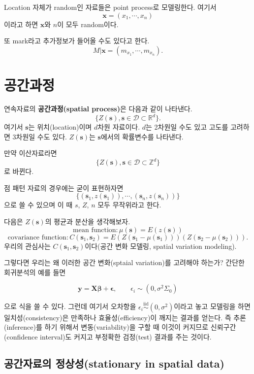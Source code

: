 \documentclass[b5paper,]{scrbook}
\theoremstyle{plain}
\theoremstyle{definition}
\numberwithin{equation}{section}
\begin{document}
Location 자체가 random인 자료들은 point process로 모델링한다. 여기서
\[\mathbf{x}=(x_{1}, \cdots , x_{n})\] 이라고 하면 \(\mathbf{x}\)와
\(n\)이 모두 random이다.

또 mark라고 추가정보가 들어올 수도 있다고 한다.
\[M|\mathbf{x}=(m_{x_{1}}, \cdots , m_{x_{n}}).\]

\chapter{공간과정}\label{spatialprocess}

연속자료의 \textbf{공간과정(spatial process)}은 다음과 같이 나타낸다.
\[\{Z (\mathbf{s}), \mathbf{s} \in \mathcal{D} \subset \mathbb{R}^{d} \} .\]
여기서 \(\mathbf{s}\)는 위치(location)이며 \(d\)차원 자료이다. \(d\)는
2차원일 수도 있고 고도를 고려하면 3차원일 수도 있다. \(Z(\mathbf{s})\)는
\(\mathbf{s}\)에서의 확률변수를 나타낸다.

만약 이산자료라면
\[\{Z (\mathbf{s}), \mathbf{s} \in \mathcal{D} \subset \mathbb{Z}^{d} \} \]
로 바뀐다.

점 패턴 자료의 경우에는 굳이 표현하자면
\[\{ (\mathbf{s}_{1},z(\mathbf{s}_{1})), \cdots , (\mathbf{s}_{n},z(\mathbf{s}_{n}))  \} \]
으로 쓸 수 있으며 이 때 \(s\), \(Z\), \(n\) 모두 무작위라고 한다.

다음은 \(Z(\mathbf{s})\)의 평균과 분산을 생각해보자.
\[\text{mean function}:\mu(\mathbf{s})=E(z(\mathbf{s}))\]
\[\text{covariance function}: C(\mathbf{s}_{1},\mathbf{s}_{2})=E(Z(\mathbf{s}_{1}-\mu(\mathbf{s}_{1})))(Z(\mathbf{s}_{2}-\mu(\mathbf{s}_{2}))).\]
우리의 관심사는 \(C(\mathbf{s}_{1},\mathbf{s}_{2})\)이다(공간 변화
모델링, spatial variation modeling).

그렇다면 우리는 왜 이러한 공간 변화(sptaial variation)를 고려해야
하는가? 간단한 회귀분석의 예를 들면

\begin{equation}
\mathbf{y}=\mathbf{X}\boldsymbol{\beta}+\boldsymbol{\epsilon}, \qquad{\epsilon_{i} \sim (0, \sigma^{2}\Sigma_{0})}
\end{equation}

으로 식을 쓸 수 있다. 그런데 여기서 오차항을
\(\epsilon_{i} \stackrel{\text{iid}}{\sim} (0, \sigma^{2})\)이라고 놓고
모델링을 하면 일치성(consistency)은 만족하나 효율성(efficiency)이 깨지는
결과를 얻는다. 즉 추론(inference)를 하기 위해서 변동(variability)을 구할
때 이것이 커지므로 신뢰구간(confidence interval)도 커지고 부정확한
검정(test) 결과를 주는 것이다.

\section{공간자료의 정상성(stationary in spatial
data)}\label{-stationary-in-spatial-data}
\end{document}
